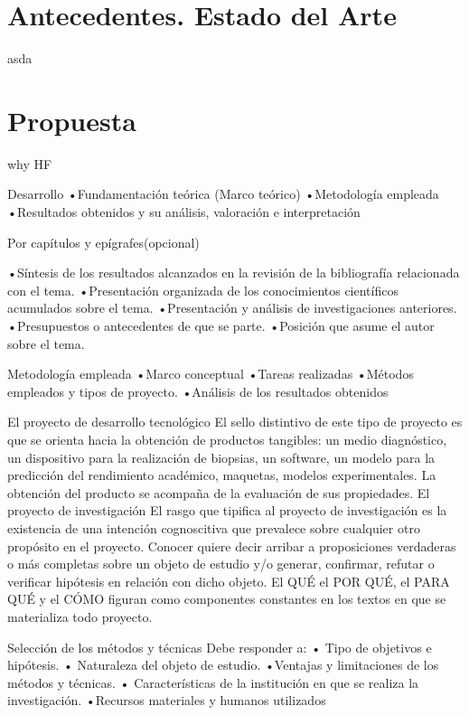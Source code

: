 \chapter{Antecedentes. Estado del Arte}\label{chapter:stateOtArt}
asda
\chapter{Propuesta}\label{chapter:proposal}
why HF

Desarrollo
•Fundamentación teórica (Marco 
teórico)
•Metodología empleada
•Resultados obtenidos y su análisis, 
valoración e interpretación

Por capítulos 
y epígrafes(opcional)

•Síntesis de los resultados alcanzados en la
revisión de la bibliografía relacionada con el
tema.
•Presentación organizada de los
conocimientos científicos acumulados sobre
el tema.
•Presentación y análisis de investigaciones
anteriores.
•Presupuestos o antecedentes de que se
parte.
•Posición que asume el autor sobre el tema.

Metodología empleada
•Marco conceptual
•Tareas realizadas
•Métodos empleados y tipos de 
proyecto.
•Análisis de los resultados obtenidos

El proyecto de desarrollo tecnológico
El sello distintivo de este tipo de proyecto es que se orienta hacia
la obtención de productos tangibles: un medio diagnóstico, un
dispositivo para la realización de biopsias, un software, un
modelo para la predicción del rendimiento académico,
maquetas, modelos experimentales.
La obtención del producto se acompaña de la evaluación de
sus propiedades.
El proyecto de investigación
El rasgo que tipifica al proyecto de investigación es la existencia de
una intención cognoscitiva que prevalece sobre cualquier otro
propósito en el proyecto. Conocer quiere decir arribar a
proposiciones verdaderas o más completas sobre un objeto de
estudio y/o generar, confirmar, refutar o verificar hipótesis en
relación con dicho objeto.
El QUÉ el POR QUÉ, el PARA QUÉ y el CÓMO figuran como
componentes constantes en los textos en que se materializa todo
proyecto.

Selección de los métodos y técnicas
Debe responder a:
• Tipo de objetivos e hipótesis.
• Naturaleza del objeto de estudio.
•Ventajas y limitaciones de los métodos y 
técnicas.
• Características de la institución en que se 
realiza la investigación.
•Recursos materiales y humanos utilizados
